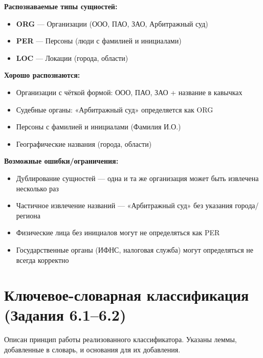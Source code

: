 \documentclass[12pt, a4paper]{report}
\begin{document}
\begin{tcolorbox}[infobox, title={Наблюдения по работе NER}]
\textbf{Распознаваемые типы сущностей:}
\begin{itemize}
  \item \textbf{ORG} — Организации (ООО, ПАО, ЗАО, Арбитражный суд)
  \item \textbf{PER} — Персоны (люди с фамилией и инициалами)
  \item \textbf{LOC} — Локации (города, области)
\end{itemize}

\textbf{Хорошо распознаются:}
\begin{itemize}
  \item Организации с чёткой формой: ООО, ПАО, ЗАО + название в кавычках
  \item Судебные органы: «Арбитражный суд» определяется как ORG
  \item Персоны с фамилией и инициалами (Фамилия И.О.)
  \item Географические названия (города, области)
\end{itemize}

\textbf{Возможные ошибки/ограничения:}
\begin{itemize}
  \item Дублирование сущностей — одна и та же организация может быть извлечена несколько раз
  \item Частичное извлечение названий — «Арбитражный суд» без указания города/региона
  \item Физические лица без инициалов могут не определяться как PER
  \item Государственные органы (ИФНС, налоговая служба) могут определяться не всегда корректно
\end{itemize}
\end{tcolorbox}

\section{Ключевое-словарная классификация (Задания 6.1–6.2)}

Описан принцип работы реализованного классификатора. Указаны леммы, добавленные в словарь, и основания для их добавления.
\end{document}
